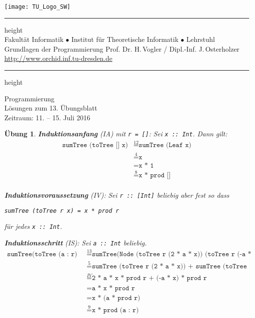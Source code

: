 \documentclass[11pt, twoside, BCOR=16mm, a4paper, DIV=15, numbers=noenddot]{scrartcl}
\makeatletter
\theoremstyle{break}
\newtheorem{ex}{Übung}
\def\hrulefill{\leavevmode\leaders \hrule height \rulethickness \hfill\kern\z@}
\makeatother
\begin{document}
\vspace*{-5mm}\hspace*{-4mm}\texttt{[image: TU\_Logo\_SW]}
\quad
\begin{minipage}[b]{12.3cm}
  \hrulefill\\
  \scriptsize
  {\scriptsize{Fakult\"at Informatik} {$\bullet$}
    Institut f\"ur Theoretische Informatik {$\bullet$}
    Lehrstuhl Grundlagen der Programmierung }
  Prof. Dr. H.\,Vogler / Dipl.-Inf. J.\,Osterholzer \hfill\url{http://www.orchid.inf.tu-dresden.de}\\[-2.1mm]
  \mbox{}\hrulefill
\end{minipage}

\begin{center}
  \huge Programmierung\\
  \Large Lösungen zum 13. Übungsblatt\\[1mm]
  \small Zeitraum: 11. -- 15. Juli 2016\\[3mm]
\end{center}

\begin{ex}
  \textbf{Induktionsanfang }(IA) mit \texttt{r = []}:
Sei \texttt{x :: Int}. Dann gilt:
\begin{align*}
  \texttt{sumTree (toTree [] x)}&\stackrel{12}{=}\texttt{sumTree (Leaf x)}\\
  &\stackrel{4}{=}\texttt{x}\\
  &=\texttt{x * 1}\\
  &\stackrel{8}{=}\texttt{x * prod []}\\
\end{align*}

\noindent\textbf{Induktionsvoraussetzung }(IV):
Sei \texttt{r :: [Int]} beliebig aber fest so dass
\begin{center}
  \texttt{sumTree (toTree r x) = x * prod r}\;
\end{center}
für jedes \texttt{x :: Int}.
 
\noindent\textbf{Induktionsschritt }(IS):
Sei \texttt{a :: Int} beliebig.
\begin{align*}
  \texttt{sumTree(toTree (a : r) x) }&\stackrel{13}{=}\texttt{sumTree(Node (toTree r (2 * a * x)) (toTree r (-a * x)))}\\
  &\stackrel{5}{=}\texttt{sumTree (toTree r (2 * a * x)) + sumTree (toTree r (-a * x))}\\
  &\stackrel{IV}{=}\texttt{2 * a * x * prod r + (-a * x) * prod r}\\
  &=\texttt{a * x * prod r}\\
  &=\texttt{x * (a * prod r)}\\
  &\stackrel{9}{=}\texttt{x * prod (a : r)}\\
\end{align*}

\end{ex}
\end{document}
